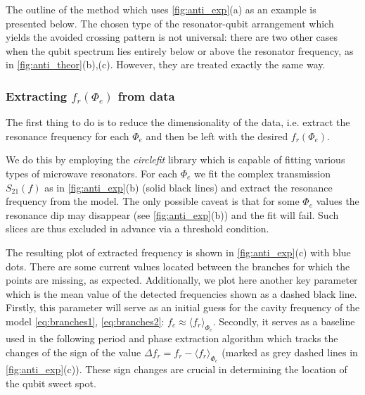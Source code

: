\documentclass[%
 aip,
 amsmath,amssymb,
 reprint,%
]{revtex4-1}
\begin{document}
The outline of the method which uses \autoref{fig:anti_exp}(a) as an example is presented below. The chosen type of the resonator-qubit arrangement which yields the avoided crossing pattern is not universal: there are two other cases when the qubit spectrum lies entirely below or above the resonator frequency, as in \autoref{fig:anti_theor}(b),(c). However, they are treated exactly the same way.

\subsubsection{Extracting $f_r(\Phi_e)$ from data}\label{sec:extract_fr}

The first thing to do is to reduce the dimensionality of the data, i.e. extract the resonance frequency for each $\Phi_e$ and then be left with the desired $f_r(\Phi_e)$. 

We do this by employing the \textit{circlefit}\cite{probst2015} library which is capable of fitting various types of microwave resonators. For each $\Phi_e$ we fit the complex transmission $S_{21}(f)$ as in \autoref{fig:anti_exp}(b) (solid black lines) and extract the resonance frequency from the model. The only possible caveat is that for some $\Phi_e$ values the resonance dip may disappear (see \autoref{fig:anti_exp}(b)) and the fit will fail. Such slices are thus excluded in advance via a threshold condition.

The resulting plot of extracted frequency is shown in \autoref{fig:anti_exp}(c) with blue dots. There are some current values located between the branches for which the points are missing, as expected. Additionally, we plot here another key parameter which is the mean value of the detected frequencies shown as a dashed black line. Firstly, this parameter will serve as an initial guess for the cavity frequency of the model \eqref{eq:branches1}, \eqref{eq:branches2}: $f_c \approx \langle f_r \rangle_{\Phi_e}$.  Secondly, it serves as a baseline used in the following period and phase extraction algorithm which tracks the changes of the sign of the value $\Delta f_r = f_r - \langle f_r \rangle_{\Phi_e}$ (marked as grey dashed lines in \autoref{fig:anti_exp}(c)). These sign changes are crucial in determining the location of the qubit sweet spot. 
\end{document}
